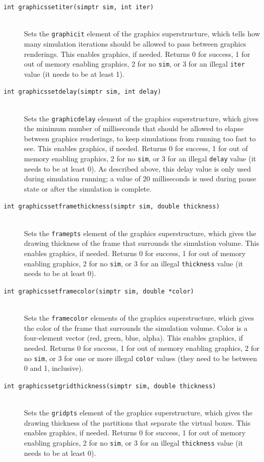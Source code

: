 \documentclass {scrbook}
\newcommand {\ttt} {\texttt}
\begin{document}
\begin{description}
\item[\ttt{int graphicssetiter(simptr sim, int iter)}]
\hfill \\
Sets the \ttt{graphicit} element of the graphics superstructure, which tells how many simulation iterations should be allowed to pass between graphics renderings. This enables graphics, if needed. Returns 0 for success, 1 for out of memory enabling graphics, 2 for no \ttt{sim}, or 3 for an illegal \ttt{iter} value (it needs to be at least 1).

\item[\ttt{int graphicssetdelay(simptr sim, int delay)}]
\hfill \\
Sets the \ttt{graphicdelay} element of the graphics superstructure, which gives the minimum number of milliseconds that should be allowed to elapse between graphics renderings, to keep simulations from running too fast to see. This enables graphics, if needed. Returns 0 for success, 1 for out of memory enabling graphics, 2 for no \ttt{sim}, or 3 for an illegal \ttt{delay} value (it needs to be at least 0). As described above, this delay value is only used during simulation running; a value of 20 milliseconds is used during pause state or after the simulation is complete.

\item[\ttt{int graphicssetframethickness(simptr sim, double thickness)}]
\hfill \\
Sets the \ttt{framepts} element of the graphics superstructure, which gives the drawing thickness of the frame that surrounds the simulation volume. This enables graphics, if needed. Returns 0 for success, 1 for out of memory enabling graphics, 2 for no \ttt{sim}, or 3 for an illegal \ttt{thickness} value (it needs to be at least 0).

\item[\ttt{int graphicssetframecolor(simptr sim, double *color)}]
\hfill \\
Sets the \ttt{framecolor} elements of the graphics superstructure, which gives the color of the frame that surrounds the simulation volume. Color is a four-element vector (red, green, blue, alpha). This enables graphics, if needed. Returns 0 for success, 1 for out of memory enabling graphics, 2 for no \ttt{sim}, or 3 for one or more illegal \ttt{color} values (they need to be between 0 and 1, inclusive).

\item[\ttt{int graphicssetgridthickness(simptr sim, double thickness)}]
\hfill \\
Sets the \ttt{gridpts} element of the graphics superstructure, which gives the drawing thickness of the partitions that separate the virtual boxes. This enables graphics, if needed. Returns 0 for success, 1 for out of memory enabling graphics, 2 for no \ttt{sim}, or 3 for an illegal \ttt{thickness} value (it needs to be at least 0).


\end{description}
\end{document}
